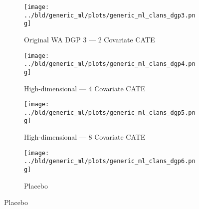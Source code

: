 \documentclass[11pt, a4paper, leqno]{article}
\begin{document}
\begin{figure}
    \caption{Simulation Results: Generic ML --- CLANS}\label{fig:clans}

    \centering
     \begin{subfigure}[b]{0.475\textwidth}
         \centering
         \texttt{[image: ../bld/generic\_ml/plots/generic\_ml\_clans\_dgp3.png]}
         \caption{Original WA DGP 3 --- 2 Covariate CATE}\label{fig_clans:dgp3}
     \end{subfigure}
     \hfill
     \begin{subfigure}[b]{0.475\textwidth}
         \centering
         \texttt{[image: ../bld/generic\_ml/plots/generic\_ml\_clans\_dgp4.png]}
         \caption{High-dimensional --- 4 Covariate CATE}\label{fig_clans:dgp4}
     \end{subfigure}

     \begin{subfigure}[b]{0.475\textwidth}
         \centering
         \texttt{[image: ../bld/generic\_ml/plots/generic\_ml\_clans\_dgp5.png]}
         \caption{High-dimensional --- 8 Covariate CATE}\label{fig_clans:dgp5}
     \end{subfigure}
     \begin{subfigure}[b]{0.475\textwidth}
         \centering
         \texttt{[image: ../bld/generic\_ml/plots/generic\_ml\_clans\_dgp6.png]}
         \caption{Placebo}\label{fig_clans:dgp6}
     \end{subfigure}



\end{figure}
\end{document}
